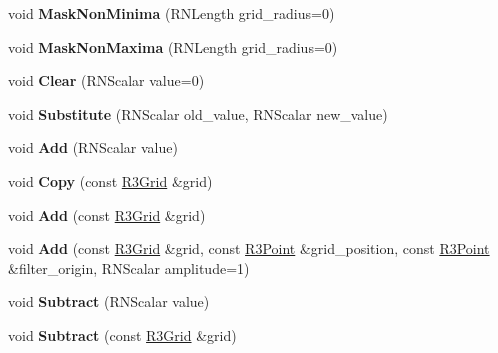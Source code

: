 \begin{DoxyCompactItemize}
\item 
void {\bfseries Mask\+Non\+Minima} (R\+N\+Length grid\+\_\+radius=0)\hypertarget{class_r3_grid_a15468c7af24ce6496956a03be1b4d0b8}{}\label{class_r3_grid_a15468c7af24ce6496956a03be1b4d0b8}

\item 
void {\bfseries Mask\+Non\+Maxima} (R\+N\+Length grid\+\_\+radius=0)\hypertarget{class_r3_grid_a10f0a4cd8c16f11facaa817e6a30a81a}{}\label{class_r3_grid_a10f0a4cd8c16f11facaa817e6a30a81a}

\item 
void {\bfseries Clear} (R\+N\+Scalar value=0)\hypertarget{class_r3_grid_a9221437f915eeb8fb73a6a06fe219545}{}\label{class_r3_grid_a9221437f915eeb8fb73a6a06fe219545}

\item 
void {\bfseries Substitute} (R\+N\+Scalar old\+\_\+value, R\+N\+Scalar new\+\_\+value)\hypertarget{class_r3_grid_a843bc03547c84f65b7349a4ea2ce1439}{}\label{class_r3_grid_a843bc03547c84f65b7349a4ea2ce1439}

\item 
void {\bfseries Add} (R\+N\+Scalar value)\hypertarget{class_r3_grid_a3d366202bec97966afd7f43dbb303ac4}{}\label{class_r3_grid_a3d366202bec97966afd7f43dbb303ac4}

\item 
void {\bfseries Copy} (const \hyperlink{class_r3_grid}{R3\+Grid} \&grid)\hypertarget{class_r3_grid_a5b9f1c37fdb1037bde88a032f5f1675a}{}\label{class_r3_grid_a5b9f1c37fdb1037bde88a032f5f1675a}

\item 
void {\bfseries Add} (const \hyperlink{class_r3_grid}{R3\+Grid} \&grid)\hypertarget{class_r3_grid_aae66b9b898621a40f6823b9965b778ce}{}\label{class_r3_grid_aae66b9b898621a40f6823b9965b778ce}

\item 
void {\bfseries Add} (const \hyperlink{class_r3_grid}{R3\+Grid} \&grid, const \hyperlink{class_r3_point}{R3\+Point} \&grid\+\_\+position, const \hyperlink{class_r3_point}{R3\+Point} \&filter\+\_\+origin, R\+N\+Scalar amplitude=1)\hypertarget{class_r3_grid_a7d39171de5aca13f5a59c8cf8246cf9e}{}\label{class_r3_grid_a7d39171de5aca13f5a59c8cf8246cf9e}

\item 
void {\bfseries Subtract} (R\+N\+Scalar value)\hypertarget{class_r3_grid_aea6fd52af1ab0e4a2ae878f8d7123141}{}\label{class_r3_grid_aea6fd52af1ab0e4a2ae878f8d7123141}

\item 
void {\bfseries Subtract} (const \hyperlink{class_r3_grid}{R3\+Grid} \&grid)\hypertarget{class_r3_grid_a21012076c66a167c5b794a8a996d0f9b}{}\label{class_r3_grid_a21012076c66a167c5b794a8a996d0f9b}


\end{DoxyCompactItemize}
